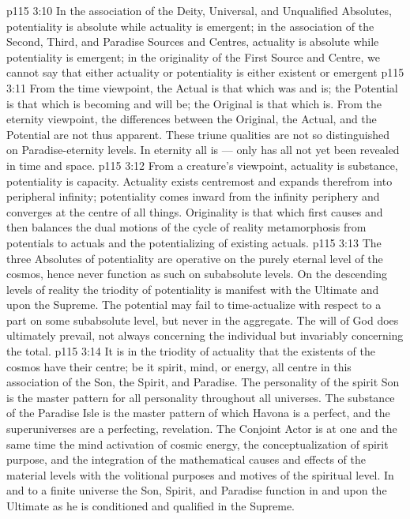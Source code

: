 \vs p115 3:10 In the association of the Deity, Universal, and Unqualified Absolutes, potentiality is absolute while actuality is emergent; in the association of the Second, Third, and Paradise Sources and Centres, actuality is absolute while potentiality is emergent; in the originality of the First Source and Centre, we cannot say that either actuality or potentiality is either existent or emergent 
\vs p115 3:11 From the time viewpoint, the Actual is that which was and is; the Potential is that which is becoming and will be; the Original is that which is. From the eternity viewpoint, the differences between the Original, the Actual, and the Potential are not thus apparent. These triune qualities are not so distinguished on Paradise\hyp{}eternity levels. In eternity all is --- only has all not yet been revealed in time and space.
\vs p115 3:12 From a creature’s viewpoint, actuality is substance, potentiality is capacity. Actuality exists centremost and expands therefrom into peripheral infinity; potentiality comes inward from the infinity periphery and converges at the centre of all things. Originality is that which first causes and then balances the dual motions of the cycle of reality metamorphosis from potentials to actuals and the potentializing of existing actuals.
\vs p115 3:13 The three Absolutes of potentiality are operative on the purely eternal level of the cosmos, hence never function as such on subabsolute levels. On the descending levels of reality the triodity of potentiality is manifest with the Ultimate and upon the Supreme. The potential may fail to time\hyp{}actualize with respect to a part on some subabsolute level, but never in the aggregate. The will of God does ultimately prevail, not always concerning the individual but invariably concerning the total.
\vs p115 3:14 It is in the triodity of actuality that the existents of the cosmos have their centre; be it spirit, mind, or energy, all centre in this association of the Son, the Spirit, and Paradise. The personality of the spirit Son is the master pattern for all personality throughout all universes. The substance of the Paradise Isle is the master pattern of which Havona is a perfect, and the superuniverses are a perfecting, revelation. The Conjoint Actor is at one and the same time the mind activation of cosmic energy, the conceptualization of spirit purpose, and the integration of the mathematical causes and effects of the material levels with the volitional purposes and motives of the spiritual level. In and to a finite universe the Son, Spirit, and Paradise function in and upon the Ultimate as he is conditioned and qualified in the Supreme.
